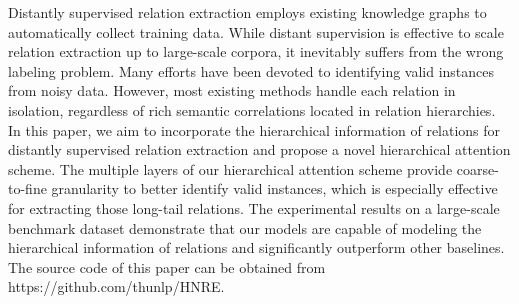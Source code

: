 Distantly supervised relation extraction employs existing knowledge graphs to automatically collect training data. While distant supervision is effective to scale relation extraction up to large-scale corpora, it inevitably suffers from the wrong labeling problem. Many efforts have been devoted to identifying valid instances from noisy data. However, most existing methods handle each relation in isolation, regardless of rich semantic correlations located in relation hierarchies. In this paper, we aim to incorporate the hierarchical information of relations for distantly supervised relation extraction and propose a novel hierarchical attention scheme. The multiple layers of our hierarchical attention scheme provide coarse-to-fine granularity to better identify valid instances, which is especially effective for extracting those long-tail relations. The experimental results on a large-scale benchmark dataset demonstrate that our models are capable of modeling the hierarchical information of relations and significantly outperform other baselines. The source code of this paper can be obtained from https://github.com/thunlp/HNRE.
